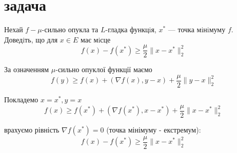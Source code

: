 \section{задача}

\begin{tcolorbox}[title=Умова]
    Нехай $f - \mu$-сильно опукла та $L$-гладка функцiя, $x^*$ — точка мiнiмуму $f$. Доведiть, що для $x \in E$ має мiсце
    $$ f(x) - f(x^*) \geq \frac{\mu}{2} \|x - x^*\|_2^2 $$
\end{tcolorbox}

За означенням $\mu$-сильно опуклої функції маємо
$$ f(y) \geq f(x) + (\nabla f(x), y - x) + \frac{\mu}{2} \|y - x\|_2^2 $$

Покладемо $x=x^*, y = x$ 
$$ f(x) \geq f(x^*) + (\nabla f(x^*), x - x^*) + \frac{\mu}{2} \|x - x^*\|_2^2 $$


врахуємо рівність $\nabla f(x^*)=0$ (точка мінімуму - екстремум):
$$ f(x) - f(x^*) \geq \frac{\mu}{2} \|x - x^*\|_2^2 $$

